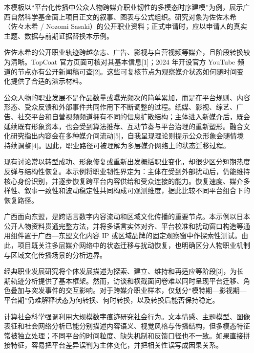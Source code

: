 \GXNSFBodyText

本模板以“平台化传播中公众人物跨媒介职业韧性的多模态时序建模”为例，展示广西自然科学基金面上项目正文的叙事、图表与公式组织。研究对象为佐佐木希（佐々木希 / Nozomi Sasaki）的公开职业资料；正式申请时，应以申请人的真实主题、数据与前期证据替换本示例。

佐佐木希的公开职业轨迹跨越杂志、广告、影视与自营视频等媒介，且阶段转换较为清晰。TopCoat 官方页面可核对其基本信息[1]；2024 年开设官方 YouTube 频道的节点亦有公开新闻稿可查[2]。这些可复核节点为观察媒介状态如何随时间变化提供了合适的演示材料。


公众人物的职业发展不是作品数量或曝光频次的简单累加，而是在平台规则、内容形态、受众反馈和外部事件共同作用下不断调整的过程。纸媒、影视、综艺、广告、社交平台和自营视频频道拥有不同的信息扩散结构；主体进入新媒介后，既会延续既有形象资本，也会受到算法推荐、互动节奏与平台治理的重新塑形。融合文化研究指出内容会在多种媒介间流动[5]，自我呈现理论则提示公众形象会随情境持续调整[4]。因此，职业路径可被理解为多层媒介网络上的状态迁移过程。

现有讨论常以转型成功、形象修复或重新出发概括职业变化，却很少区分短期热度反弹与结构性恢复。本示例将职业韧性界定为：主体在受到外部扰动后，仍能维持核心身份识别，并逐步恢复跨平台内容供给和受众连接的能力。恢复速度、媒介多样性、叙事一致性和波动稳定性共同构成可观测维度，据此比较不同平台组合下的恢复路径。

广西面向东盟，是跨语言数字内容流动和区域文化传播的重要节点。本示例以日本公开人物资料贯通完整方法，并将多语言实体对齐、平台校准和扰动窗口构造等通用组件置于广西—东盟文化内容 IP 或区域品牌的固定观察窗中作探索性测试。由此，项目既关注多层媒介网络中的状态迁移与扰动恢复，也明确区分人物职业机制与区域文化传播场景的分析边界。


经典职业发展研究将个体发展描述为探索、建立、维持和再适应等阶段[3]，为长期轨迹分析提供了基本框架。然而，访谈和横截面问卷难以同时呈现平台迁移、角色叠加与突发事件的交互影响。对于跨媒介职业样本，仅划分“模特期—影视期—平台期”仍难解释状态为何转换、何时转换，以及转换后能否保持稳定。

计算社会科学强调利用大规模数字痕迹研究社会行为。文本情感、主题模型、图像表征和社会网络分析已能分别描述内容语义、视觉风格与传播结构，但多模态特征常被独立处理；不同平台的时间粒度、缺失机制和反馈口径也不一致。如果直接拼接特征，容易把平台差异误判为主体变化，并把相关性误写成因果关系。

